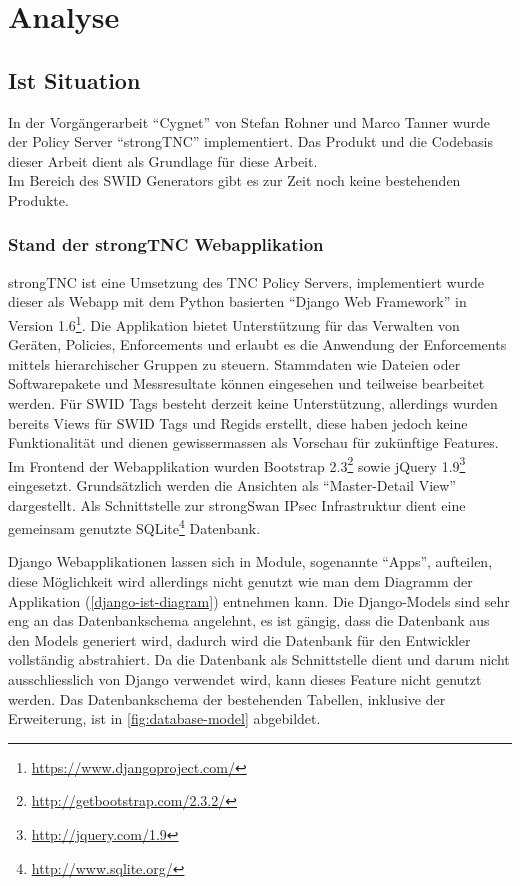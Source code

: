 \chapter{Analyse}

\section{Ist Situation}
In der Vorgängerarbeit \enquote{Cygnet} von Stefan Rohner und Marco
Tanner\cite{cygnet:2013} wurde der Policy Server \enquote{strongTNC}
implementiert. Das Produkt und die Codebasis dieser Arbeit dient als Grundlage
für diese Arbeit.\\
Im Bereich des SWID Generators gibt es zur Zeit noch keine bestehenden Produkte.

\subsection{Stand der strongTNC Webapplikation} 
strongTNC ist eine Umsetzung des TNC Policy Servers, implementiert wurde dieser
als Webapp mit dem Python basierten \enquote{Django Web Framework} in Version
1.6\footnote{\url{https://www.djangoproject.com/}}. Die Applikation bietet
Unterstützung für das Verwalten von Geräten, Policies, Enforcements und erlaubt
es die Anwendung der Enforcements mittels hierarchischer Gruppen zu steuern.
Stammdaten wie Dateien oder Softwarepakete und Messresultate können eingesehen
und teilweise bearbeitet werden. Für SWID Tags besteht derzeit keine
Unterstützung, allerdings wurden bereits Views für SWID Tags und Regids
erstellt, diese haben jedoch keine Funktionalität und dienen gewissermassen als
Vorschau für zukünftige Features. \\ Im Frontend der Webapplikation wurden
Bootstrap 2.3\footnote{\url{http://getbootstrap.com/2.3.2/}} sowie jQuery
1.9\footnote{\url{http://jquery.com/1.9}} eingesetzt. Grundsätzlich werden die
Ansichten als \enquote{Master-Detail View} dargestellt. Als Schnittstelle zur
strongSwan IPsec Infrastruktur dient eine gemeinsam genutzte
SQLite\footnote{\url{http://www.sqlite.org/}} Datenbank.

Django Webapplikationen lassen sich in Module, sogenannte \enquote{Apps},
aufteilen, diese Möglichkeit wird allerdings nicht genutzt wie man dem Diagramm
der Applikation (\autoref{django-ist-diagram}) entnehmen kann. Die Django-Models
sind sehr eng an das Datenbankschema angelehnt, es ist gängig, dass die
Datenbank aus den Models generiert wird, dadurch wird die Datenbank für den
Entwickler vollständig abstrahiert. Da die Datenbank als Schnittstelle dient und
darum nicht ausschliesslich von Django verwendet wird, kann dieses Feature nicht
genutzt werden. Das Datenbankschema der bestehenden Tabellen, inklusive der
Erweiterung, ist in \autoref{fig:database-model} abgebildet.

